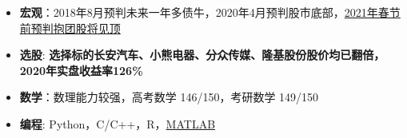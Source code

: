   \begin{itemize}[leftmargin=*]
    \item \textbf{宏观}：2018年8月预判未来一年多债牛，2020年4月预判股市底部，\href{https://xueqiu.com/1376056330/172009168}{2021年春节前预判抱团股将见顶}
    \item \textbf{选股}: \textbf{选择标的长安汽车、小熊电器、分众传媒、隆基股份股价均已翻倍，2020年实盘收益率126\%}
    \item \textbf{数学}：数理能力较强，高考数学 146/150，考研数学 149/150
    \item \textbf{编程}: Python，C/C++，R，\href{https://www.mathworks.com/}{MATLAB}
  \end{itemize}